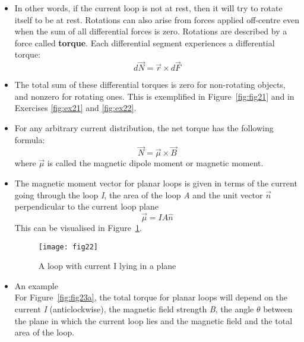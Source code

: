 \begin{enumerate}
\begin{itemize}
        \item In other words, if the current loop is not at rest, then it will try to rotate itself to be at rest. Rotations can also arise from forces applied off-centre even when the sum of all differential forces is zero. Rotations are described by a force called \textbf{torque}. Each differential segment experiences a differential torque: \\
        \begin{equation}
            d\vec{N} = \vec{r} \times d\vec{F}
        \end{equation}

        \item The total sum of these differential torques is zero for non-rotating objects, and nonzero for rotating ones. This is exemplified in Figure~\ref{fig:fig21} and in Exercises \ref{fig:ex21} and \ref{fig:ex22}.

        \item For any arbitrary current distribution, the net torque has the following formula: \\
        \begin{equation} \label{eq:eq24}
            \vec{N} = \vec{\mu} \times \vec{B}
        \end{equation}
        where $\vec{\mu}$ is called the magnetic dipole moment or magnetic moment. 
        
        \item The magnetic moment vector for planar loops is given in
            terms of the current going through the loop \textit{I}, the area of the
            loop \textit{A} and the unit vector $\vec{n}$ perpendicular to the
            current loop plane \\
        \begin{equation} \label{eq:eq25}
            \vec{\mu} = I A \hat{n}
        \end{equation}
        This can be visualised in Figure~\ref{fig:fig22}.
        \begin{figure}[H]
            \centering
            \texttt{[image: fig22]}
            \caption{ A loop with current I lying in a plane
            } 
            \label{fig:fig22}
        \end{figure}
        
        
        \item An example \\
            For Figure~\ref{fig:fig23a}, 
            the total torque for planar loops will depend on the current
            \textit{I} (anticlockwise), the magnetic field strength \textit{B}, the angle
            \textit{$\theta$} between the plane in which the current loop lies and the
            magnetic field and the total area of the loop. \\ 
        

\end{itemize}
\end{enumerate}
